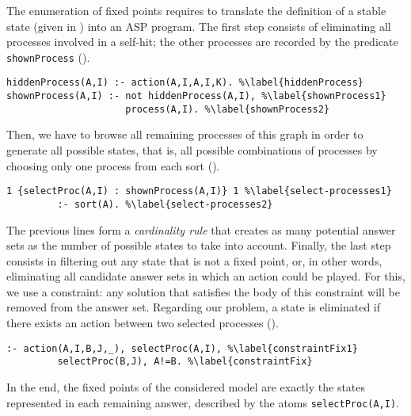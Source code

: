 The enumeration of fixed points requires to translate the definition of a stable state (given in )
into an ASP program.
The first step consists of eliminating all processes involved in a self-hit;
the other processes are recorded by the predicate \texttt{shownProcess} ().
\begin{lstlisting}
hiddenProcess(A,I) :- action(A,I,A,I,K). %\label{hiddenProcess}
shownProcess(A,I) :- not hiddenProcess(A,I), %\label{shownProcess1}
                     process(A,I). %\label{shownProcess2}
\end{lstlisting}
Then, we have to browse all remaining processes of this graph in order to generate all possible states,
that is, all possible combinations of processes by choosing only one process from each sort ().
\begin{lstlisting}
1 {selectProc(A,I) : shownProcess(A,I)} 1 %\label{select-processes1}
         :- sort(A). %\label{select-processes2}
\end{lstlisting}
The previous lines form a \emph{cardinality rule} that creates as many potential answer sets as the number of possible states
to take into account.
Finally, the last step consists in filtering out any state that is not a fixed point,
or, in other words, eliminating all candidate answer sets in which an action could be played. For this, we use a constraint:
any solution that satisfies the body of this constraint will be removed from the answer set.
Regarding our problem, a state is eliminated if there exists an action between two selected processes ().
\begin{lstlisting}
:- action(A,I,B,J,_), selectProc(A,I), %\label{constraintFix1}
         selectProc(B,J), A!=B. %\label{constraintFix}
\end{lstlisting}
In the end, the fixed points of the considered model are exactly the states represented in each remaining answer,
described by the atoms \texttt{selectProc(A,I)}.

